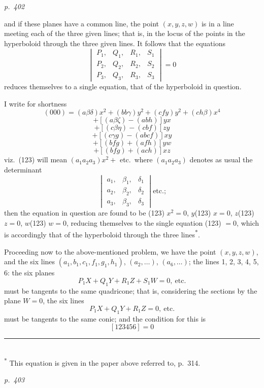 \documentclass[11pt,a4paper]{article}
\theoremstyle{plain}
\theoremstyle{definition}
\begin{document}
\clearpage

\bigskip
\textit{p.~402}
\smallskip

\noindent
and if these planes have a common line, the point $(x, y, z, w)$ is in a line meeting
each of the three given lines; that is, in the locus of the points in the hyperboloid
through the three given lines.  It follows that the equations
\[
\begin{vmatrix}
P_1, & Q_1, & R_1, & S_1 \\
P_2, & Q_2, & R_2, & S_2 \\
P_3, & Q_3, & R_3, & S_3
\end{vmatrix} = 0
\]
reduces themselves to a single equation, that of the hyperboloid in question.

I write for shortness
\[
(000) = (a\beta\delta) x^2 + (bb \gamma) y^2 + (cf y) y^2 + (ch \beta) x^4
\]
\[
+ [(a\beta\zeta) - (a b h)] y x
\]
\[
+ [(c\beta\eta) - (c b f)] z y
\]
\[
+ [(c\gamma g) - (a b c f)] xy
\]
\[
+ [(b f g) + (a f h)] yw
\]
\[
+ [(b f g) + (a c h)] xz
\]
viz.\ (123) will mean $(a_1 a_2 a_3) x^2 + $ etc.\ where $(a_1 a_2 a_3)$ denotes as usual the determinant
\[
\begin{vmatrix}
a_1, & \beta_1, & \delta_1 \\
a_2, & \beta_2, & \delta_2 \\
a_3, & \beta_3, & \delta_3
\end{vmatrix} \text{etc.;}
\]
then the equation in question are found to be (123) $x^2 = 0$, $y$(123) $x = 0$, $z$(123) $z = 0$,
$w$(123) $w = 0$, reducing themselves to the single equation (123) $= 0$, which is accordingly
that of the hyperboloid through the three lines\textsuperscript{*}.

Proceeding now to the above-mentioned problem, we have the point $(x, y, z, w)$,
and the six lines $(a_1, b_1, c_1, f_1, g_1, h_1)$, $(a_2, \ldots)$, $(a_6, \ldots)$; the lines 1, 2, 3, 4, 5, 6: the
six planes
\[
P_1 X + Q_1 Y + R_1 Z + S_1 W = 0,\ \text{etc.}
\]
must be tangents to the same quadricone; that is, considering the sections by the
plane $W = 0$, the six lines
\[
P_1 X + Q_1 Y + R_1 Z = 0,\ \text{etc.}
\]
must be tangents to the same conic; and the condition for this is
\[
[1 2 3 4 5 6] = 0
\]
\noindent\rule{0.45\textwidth}{0.4pt}\\
\footnotesize\textsuperscript{*} This equation is given in the paper above referred to, p.~314.\normalsize

\clearpage

\bigskip
\textit{p.~403}
\smallskip
\end{document}
